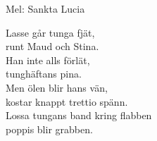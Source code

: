 \begin{SongText}
    \begin{SongInfo}
        Mel: Sankta Lucia
    \end{SongInfo}
    \begin{SongVerse}
        Lasse går tunga fjät,\\%
        runt Maud och Stina.\\%
        Han inte alls förlät,\\%
        tunghäftans pina.\\%
        Men ölen blir hans vän,\\%
        kostar knappt trettio spänn.\\%
        Lossa tungans band kring flabben\\%
        poppis blir grabben.
    \end{SongVerse}
\end{SongText}